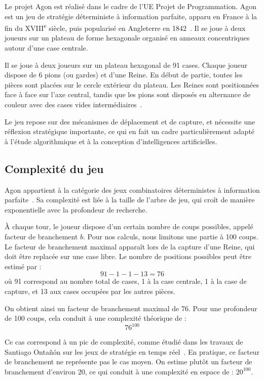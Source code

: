 \documentclass[a4paper]{article}
\begin{document}
Le projet Agon est réalisé dans le cadre de l’UE Projet de Programmation. Agon est un jeu de stratégie déterministe à information parfaite, apparu en France à la fin du XVIII\textsuperscript{e} siècle, puis popularisé en Angleterre en 1842~\cite{agon_wiki}. Il se joue à deux joueurs sur un plateau de forme hexagonale organisé en anneaux concentriques autour d’une case centrale.

Il se joue à deux joueurs sur un plateau hexagonal de 91 cases. Chaque joueur dispose de 6 pions (ou gardes) et d’une Reine. En début de partie, toutes les pièces sont placées sur le cercle extérieur du plateau. Les Reines sont positionnées face à face sur l’axe central, tandis que les pions sont disposés en alternance de couleur avec des cases vides intermédiaires~\cite{agon_plateau}.

Le jeu repose sur des mécanismes de déplacement et de capture, et nécessite une réflexion stratégique importante, ce qui en fait un cadre particulièrement adapté à l’étude algorithmique et à la conception d’intelligences artificielles.

\subsection{Complexité du jeu}

Agon appartient à la catégorie des jeux combinatoires déterministes à information parfaite~\cite{russell2010}. Sa complexité est liée à la taille de l’arbre de jeu, qui croît de manière exponentielle avec la profondeur de recherche.

À chaque tour, le joueur dispose d’un certain nombre de coups possibles, appelé facteur de branchement $b$. Pour nos calculs, nous limitons une partie à 100 coups. Le facteur de branchement maximal apparaît lors de la capture d’une Reine, qui doit être replacée sur une case libre. Le nombre de positions possibles peut être estimé par :
\[
91 - 1 - 1 - 13 = 76
\]
où 91 correspond au nombre total de cases, 1 à la case centrale, 1 à la case de capture, et 13 aux cases occupées par les autres pièces.

On obtient ainsi un facteur de branchement maximal de 76. Pour une profondeur de 100 coups, cela conduit à une complexité théorique de :
\[
76^{100}
\]

Ce cas correspond à un pic de complexité, comme étudié dans les travaux de Santiago Ontañón sur les jeux de stratégie en temps réel~\cite{ontanon2017}. En pratique, ce facteur de branchement ne représente pas le cas moyen. On estime plutôt un facteur de branchement d’environ 20, ce qui conduit à une complexité en espace de : 
$20^{100}$.
\end{document}
